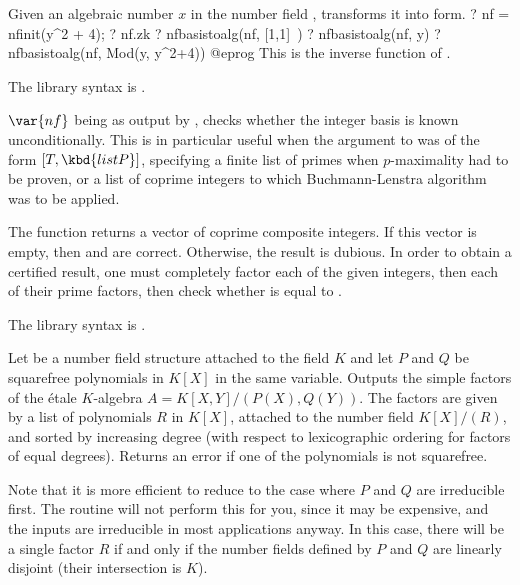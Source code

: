 \label{se:nfbasistoalg}
Given an algebraic number $x$ in the number field , transforms it
into  form.
\bprog
? nf = nfinit(y^2 + 4);
? nf.zk
? nfbasistoalg(nf, [1,1]~)
? nfbasistoalg(nf, y)
? nfbasistoalg(nf, Mod(y, y^2+4))
@eprog
This is the inverse function of .

The library syntax is .

\label{se:nfcertify}
$\var{nf}$ being as output by
, checks whether the integer basis is known unconditionally.
This is in particular useful when the argument to  was of the
form $[T, \kbd{listP}]$, specifying a finite list of primes when
$p$-maximality had to be proven, or a list of coprime integers to which
Buchmann-Lenstra algorithm was to be applied.

The function returns a vector of coprime composite integers. If this vector
is empty, then  and  are correct. Otherwise, the
result is dubious. In order to obtain a certified result, one must completely
factor each of the given integers, then  each of their prime
factors, then check whether  is equal to .

The library syntax is .

\label{se:nfcompositum}
Let  be a number field structure attached to the field $K$
and let  $P$ and $Q$
be squarefree polynomials in $K[X]$ in the same variable. Outputs
the simple factors of the \'etale $K$-algebra $A = K[X, Y] / (P(X), Q(Y))$.
The factors are given by a list of polynomials $R$ in $K[X]$, attached to
the number field $K[X]/ (R)$, and sorted by increasing degree (with respect
to lexicographic ordering for factors of equal degrees). Returns an error if
one of the polynomials is not squarefree.

Note that it is more efficient to reduce to the case where $P$ and $Q$ are
irreducible first. The routine will not perform this for you, since it may be
expensive, and the inputs are irreducible in most applications anyway. In
this case, there will be a single factor $R$ if and only if the number
fields defined by $P$ and $Q$ are linearly disjoint (their intersection is
$K$).

